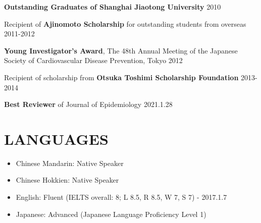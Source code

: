 \documentclass[10pt,]{article}
\providecommand{\tightlist}{%
  \setlength{\itemsep}{0pt}\setlength{\parskip}{0pt}}
\begin{document}
\textbf{Outstanding Graduates of Shanghai Jiaotong University}
\hfill 2010

Recipient of \textbf{Ajinomoto Scholarship} for outstanding students
from overseas \hfill 2011-2012

\textbf{Young Investigator's Award}, The 48th Annual Meeting of the
Japanese Society of Cardiovascular Disease Prevention, Tokyo
\hfill  2012

Recipient of scholarship from \textbf{Otsuka Toshimi Scholarship
Foundation} \hfill 2013-2014

\textbf{Best Reviewer} of Journal of Epidemiology \hfill 2021.1.28

\hypertarget{languages}{%
\section{LANGUAGES}\label{languages}}

\begin{itemize}
\tightlist
\item
  Chinese Mandarin: Native Speaker
\item
  Chinese Hokkien: Native Speaker
\item
  English: Fluent (IELTS overall: 8; L 8.5, R 8.5, W 7, S 7) - 2017.1.7
\item
  Japanese: Advanced (Japanese Language Proficiency Level 1)
\end{itemize}
\end{document}
